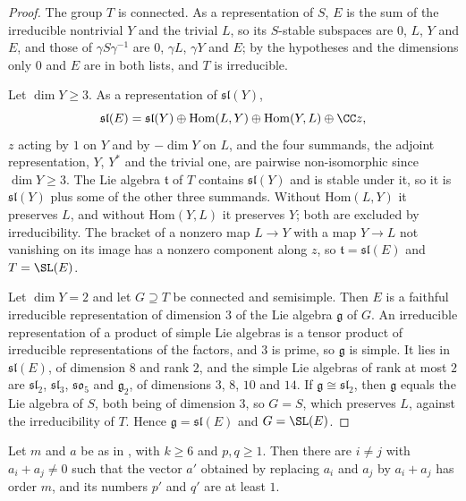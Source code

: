 \begin{proof}
The group $T$ is connected. As a representation of $S$, $E$ is
the sum of the irreducible nontrivial $Y$ and the trivial $L$, so its
$S$-stable subspaces are $0$, $L$, $Y$ and $E$, and those of
$\gamma S\gamma^{-1}$ are $0$, $\gamma L$, $\gamma Y$ and $E$; by the
hypotheses and the dimensions only $0$ and $E$ are in both lists, and $T$ is
irreducible.

Let $\dim Y\ge3$. As a representation of $\mathfrak{sl}(Y)$,
\[
  \mathfrak{sl}(E)=\mathfrak{sl}(Y)\oplus\mathrm{Hom}(L,Y)\oplus
  \mathrm{Hom}(Y,L)\oplus\CC z,
\]
$z$ acting by $1$ on $Y$ and by $-\dim Y$ on $L$, and the four summands, the
adjoint representation, $Y$, $Y^{*}$ and the trivial one, are pairwise
non-isomorphic since $\dim Y\ge3$. The Lie algebra $\mathfrak{t}$ of $T$
contains $\mathfrak{sl}(Y)$ and is stable under it, so it is
$\mathfrak{sl}(Y)$ plus some of the other three summands. Without
$\mathrm{Hom}(L,Y)$ it preserves $L$, and without $\mathrm{Hom}(Y,L)$ it
preserves $Y$; both are excluded by irreducibility. The bracket of a nonzero
map $L\to Y$ with a map $Y\to L$ not vanishing on its image has a nonzero
component along $z$, so $\mathfrak{t}=\mathfrak{sl}(E)$ and $T=\SL(E)$.

Let $\dim Y=2$ and let $G\supseteq T$ be connected and semisimple. Then $E$
is a faithful irreducible representation of dimension $3$ of the Lie algebra
$\mathfrak{g}$ of $G$. An irreducible representation of a product of simple
Lie algebras is a tensor product of irreducible representations of the
factors, and $3$ is prime, so $\mathfrak{g}$ is simple. It lies in
$\mathfrak{sl}(E)$, of dimension $8$ and rank $2$, and the simple Lie
algebras of rank at most $2$ are $\mathfrak{sl}_{2}$, $\mathfrak{sl}_{3}$,
$\mathfrak{so}_{5}$ and $\mathfrak{g}_{2}$, of dimensions $3$, $8$, $10$ and
$14$. If $\mathfrak{g}\cong\mathfrak{sl}_{2}$, then $\mathfrak{g}$ equals the
Lie algebra of $S$, both being of dimension $3$, so $G=S$, which preserves
$L$, against the irreducibility of $T$. Hence $\mathfrak{g}=\mathfrak{sl}(E)$
and $G=\SL(E)$.
\end{proof}

\begin{lemma}\label{lem:merge}
Let $m$ and $a$ be as in , with $k\ge6$ and $p,q\ge1$.
Then there are $i\ne j$ with $a_{i}+a_{j}\ne0$ such that the vector $a'$
obtained by replacing $a_{i}$ and $a_{j}$ by $a_{i}+a_{j}$ has order $m$, and
its numbers $p'$ and $q'$ are at least $1$.
\end{lemma}

